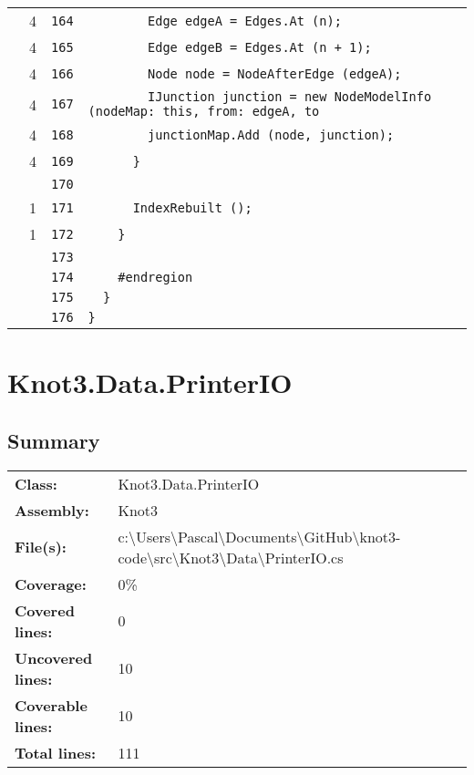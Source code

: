 \documentclass[a4paper,10pt]{article}
\begin{document}
\begin{longtable}[l]{lrrl}
\cellcolor{green} & 4 & \verb~164~ & \verb~        Edge edgeA = Edges.At (n);~\\
\cellcolor{green} & 4 & \verb~165~ & \verb~        Edge edgeB = Edges.At (n + 1);~\\
\cellcolor{green} & 4 & \verb~166~ & \verb~        Node node = NodeAfterEdge (edgeA);~\\
\cellcolor{green} & 4 & \verb~167~ & \verb~        IJunction junction = new NodeModelInfo (nodeMap: this, from: edgeA, to~\\
\cellcolor{green} & 4 & \verb~168~ & \verb~        junctionMap.Add (node, junction);~\\
\cellcolor{green} & 4 & \verb~169~ & \verb~      }~\\
\cellcolor{gray} &  & \verb~170~ & \verb~~\\
\cellcolor{green} & 1 & \verb~171~ & \verb~      IndexRebuilt ();~\\
\cellcolor{green} & 1 & \verb~172~ & \verb~    }~\\
\cellcolor{gray} &  & \verb~173~ & \verb~~\\
\cellcolor{gray} &  & \verb~174~ & \verb~    #endregion~\\
\cellcolor{gray} &  & \verb~175~ & \verb~  }~\\
\cellcolor{gray} &  & \verb~176~ & \verb~}~\\
\end{longtable}
\newpage
\section{Knot3.Data.PrinterIO}
\subsection{Summary}
\begin{longtable}[l]{ll}
\textbf{Class:} & Knot3.Data.PrinterIO\\
\textbf{Assembly:} & Knot3\\
\textbf{File(s):} & \begin{minipage}[t]{12cm}{c:\textbackslash Users\textbackslash Pascal\textbackslash Documents\textbackslash GitHub\textbackslash knot3-code\textbackslash src\textbackslash Knot3\textbackslash Data\textbackslash PrinterIO.cs}\end{minipage} \\
\textbf{Coverage:} & 0\%\\
\textbf{Covered lines:} & 0\\
\textbf{Uncovered lines:} & 10\\
\textbf{Coverable lines:} & 10\\
\textbf{Total lines:} & 111\\
\end{longtable}
\end{document}
